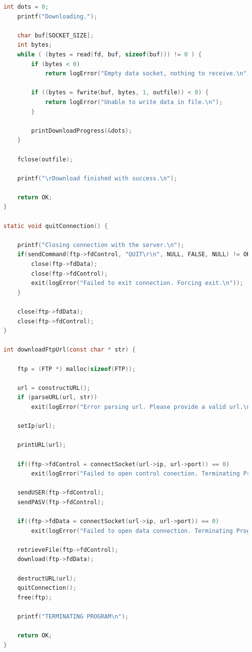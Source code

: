 \documentclass[a4paper, 11pt]{article}
\begin{document}
\begin{lstlisting}[language=C]
	int dots = 0;
	printf("Downloading.");

	char buf[SOCKET_SIZE];
	int bytes;
	while ( (bytes = read(fd, buf, sizeof(buf))) != 0 ) {
		if (bytes < 0)
			return logError("Empty data socket, nothing to receive.\n");

		if ((bytes = fwrite(buf, bytes, 1, outfile)) < 0) {
			return logError("Unable to write data in file.\n");
		}

		printDownloadProgress(&dots);
	}

	fclose(outfile);

	printf("\rDownload finished with success.\n");

	return OK;
}

static void quitConnection() {

	printf("Closing connection with the server.\n");
	if(sendCommand(ftp->fdControl, "QUIT\r\n", NULL, FALSE, NULL) != OK) {
		close(ftp->fdData);
		close(ftp->fdControl);
		exit(logError("Failed to exit connection. Forcing exit.\n"));
	}

	close(ftp->fdData);
	close(ftp->fdControl);
}

int downloadFtpUrl(const char * str) {

	ftp = (FTP *) malloc(sizeof(FTP));

	url = constructURL();
	if (parseURL(url, str))
		exit(logError("Error parsing url. Please provide a valid url.\n"));
		
	setIp(url);

	printURL(url);

	if((ftp->fdControl = connectSocket(url->ip, url->port)) == 0)
		exit(logError("Failed to open control conection. Terminating Program.\n"));

	sendUSER(ftp->fdControl);
	sendPASV(ftp->fdControl);

	if((ftp->fdData = connectSocket(url->ip, url->port)) == 0)
		exit(logError("Failed to open data connection. Terminating Program.\n"));

	retrieveFile(ftp->fdControl);
	download(ftp->fdData);

	destructURL(url);
	quitConnection();
	free(ftp);

	printf("TERMINATING PROGRAM\n");

	return OK;
}
\end{lstlisting}
\newpage
\end{document}
